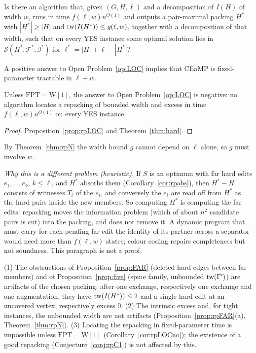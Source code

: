 \begin{problem}[LOC: locating the repacking; \textbf{no, unless $\mathrm{FPT}=\mathrm{W[1]}$}]\label{op:LOC}
Is there an algorithm that, given $(G,H,\ell)$ and a decomposition of $I(H)$ of width $w$, runs in time $f(\ell,w)n^{O(1)}$ and outputs a pair-maximal packing $H^*$ with $|H^*|\ge|H|$ and $\mathrm{tw}(I(H^*))\le g(\ell,w)$, together with a decomposition of that width, such that on every YES instance some optimal solution lies in $\mathcal S(H^*,\mathcal T^*,\beta^*)$ for $\ell^*=|H|+\ell-|H^*|$?
\end{problem}
\begin{proposition}\label{prop:rpLOC}
A positive answer to Open Problem~\ref{op:LOC} implies that CEaMP is fixed-parameter tractable in $\ell+w$.
\end{proposition}
\begin{corollary}\label{cor:rpLOCno}
Unless $\mathrm{FPT}=\mathrm{W[1]}$, the answer to Open Problem~\ref{op:LOC} is negative: no algorithm locates a repacking of bounded width and excess in time $f(\ell,w)n^{O(1)}$ on every YES instance.
\end{corollary}
\begin{proof}
Proposition~\ref{prop:rpLOC} and Theorem~\ref{thm:hard}.
\end{proof}
By Theorem~\ref{thm:rpN} the width bound $g$ cannot depend on $\ell$ alone, so $g$ must involve $w$.

\emph{Why this is a different problem (heuristic).} If $S$ is an optimum with far hard edits $e_1,\dots,e_k$, $k\le\ell$, and $H^*$ absorbs them (Corollary~\ref{cor:rpabs}), then $H^*-H$ consists of witnesses $T_i$ of the $e_i$, and conversely the $e_i$ are read off from $H^*$ as the hard pairs inside the new members. So computing $H^*$ is computing the far edits: repacking moves the information problem (which of about $n^2$ candidate pairs is cut) into the packing, and does not remove it. A dynamic program that must carry for each pending far edit the identity of its partner across a separator would need more than $f(\ell,w)$ states; colour coding repairs completeness but not soundness. This paragraph is not a proof.

 (1) The obstructions of Proposition~\ref{prop:FAR} (deleted hard edges between far members) and of Proposition~\ref{prop:five} (spine family, unbounded $\mathrm{tw}(\Gamma')$) are artifacts of the chosen packing: after one exchange, respectively one exchange and one augmentation, they have $\mathrm{tw}(I(H^*))\le2$ and a single hard edit at an uncovered vertex, respectively excess $0$. (2) The intrinsic excess and, for tight instances, the unbounded width are not artifacts (Proposition~\ref{prop:rpFAR}(a), Theorem~\ref{thm:rpN}). (3) Locating the repacking in fixed-parameter time is impossible unless $\mathrm{FPT}=\mathrm{W[1]}$ (Corollary~\ref{cor:rpLOCno}); the existence of a good repacking (Conjecture~\ref{conj:rpC1}) is not affected by this.
